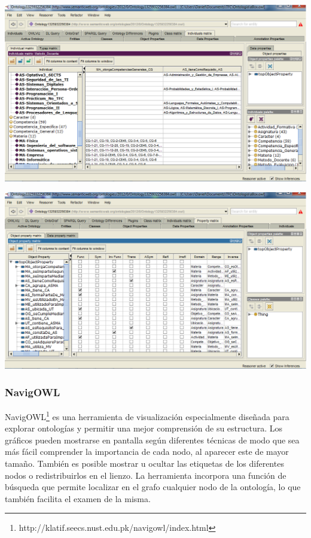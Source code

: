 \begin{center}
		\includegraphics[width=1.00\textwidth]{Imagenes/Herramientas-matrix.png}
\end{center}
\begin{center}
		\includegraphics[width=1.00\textwidth]{Imagenes/Herramientas-matrix2.png}
\end{center}

\subsubsection{NavigOWL} NavigOWL\footnote{http://klatif.seecs.nust.edu.pk/navigowl/index.html} es una herramienta de visualización especialmente diseñada para explorar ontologías y permitir una mejor comprensión de su estructura. Los gráficos pueden mostrarse en pantalla según diferentes técnicas de modo que sea más fácil comprender la importancia de cada nodo, al aparecer este de mayor tamaño. También es posible mostrar u ocultar las etiquetas de los diferentes nodos o redistribuirlos en el lienzo. La herramienta incorpora una función de búsqueda que permite localizar en el grafo cualquier nodo de la ontología, lo que también facilita el examen de la misma.


